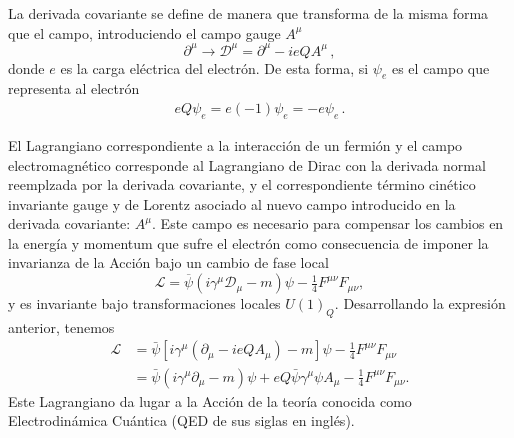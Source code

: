 La derivada covariante se define de manera que transforma de la misma forma que el campo, introduciendo el campo gauge $A^\mu$
\begin{equation}
  \label{eq:202qft}
  \partial^\mu\to\mathcal{D}^\mu=\partial^\mu-ieQA^\mu\,,
\end{equation}
donde $e$ es la carga eléctrica del electrón. De esta forma, si $\psi_e$ es el campo que representa al electrón
\begin{align}
  eQ \psi_e=e(-1)\psi_e=-e \psi_e\,.
\end{align}

El Lagrangiano correspondiente a la interacción de un fermión y el campo electromagnético corresponde al Lagrangiano de Dirac con la derivada normal reemplzada por la derivada covariante, y el correspondiente término cinético invariante gauge y de Lorentz asociado al nuevo campo introducido en la derivada covariante: $A^\mu$. Este campo es necesario para compensar los cambios en la energía y momentum que sufre el electrón como consecuencia de imponer la invarianza de la Acción bajo un cambio de fase local 
\begin{equation}
  \label{eq:201qft}
  \mathcal{L}=\overline{\psi}\left(i\gamma^\mu\mathcal{D}_\mu-m\right)\psi -\tfrac{1}{4}F^{\mu\nu}F_{\mu\nu},
\end{equation}
y es invariante bajo transformaciones locales $U(1)_Q$. Desarrollando la expresión anterior, tenemos
\begin{align}
    \mathcal{L}&=\bar{\psi}\left[i\gamma^\mu\left(\partial_\mu-ieQA_\mu\right)-m\right]\psi -\tfrac{1}{4}F^{\mu\nu}F_{\mu\nu}\nonumber\\
    &=\bar{\psi}\left(i\gamma^\mu\partial_\mu-m\right)\psi+eQ\bar{\psi}\gamma^\mu\psi A_\mu -\tfrac{1}{4}F^{\mu\nu}F_{\mu\nu}.
\end{align}
Este Lagrangiano da lugar a la Acción de la teoría conocida como Electrodinámica Cuántica (QED de sus siglas en inglés).

